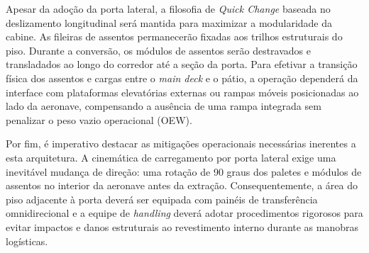 Apesar da adoção da porta lateral, a filosofia de \textit{Quick Change} baseada no deslizamento longitudinal será mantida para maximizar a modularidade da cabine. As fileiras de assentos permanecerão fixadas aos trilhos estruturais do piso. Durante a conversão, os módulos de assentos serão destravados e transladados ao longo do corredor até a seção da porta. Para efetivar a transição física dos assentos e cargas entre o \textit{main deck} e o pátio, a operação dependerá da interface com plataformas elevatórias externas ou rampas móveis posicionadas ao lado da aeronave, compensando a ausência de uma rampa integrada sem penalizar o peso vazio operacional (OEW).

Por fim, é imperativo destacar as mitigações operacionais necessárias inerentes a esta arquitetura. A cinemática de carregamento por porta lateral exige uma inevitável mudança de direção: uma rotação de 90 graus dos paletes e módulos de assentos no interior da aeronave antes da extração. Consequentemente, a área do piso adjacente à porta deverá ser equipada com painéis de transferência omnidirecional e a equipe de \textit{handling} deverá adotar procedimentos rigorosos para evitar impactos e danos estruturais ao revestimento interno durante as manobras logísticas.
